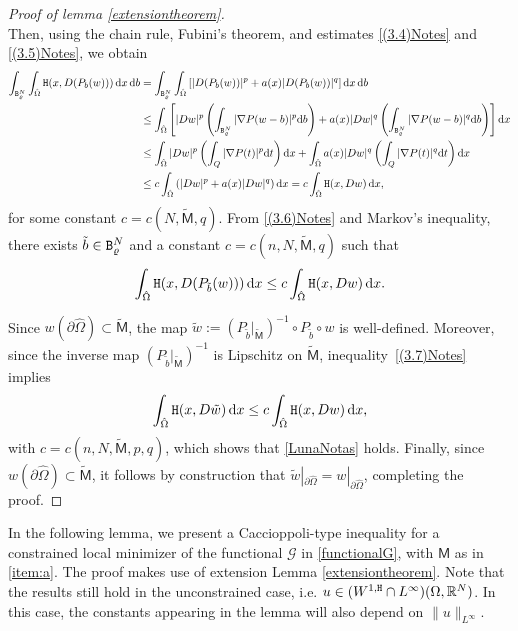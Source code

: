 \documentclass[a4paper]{amsart}
\theoremstyle{plain}  %
\numberwithin{equation}{section}
\newcommand{\R}{\mathbb{R}}
\newcommand{\mm}{\mathsf{M}}
\newcommand{\rr}{\varrho}
\newcommand{\nr}[1]{\lVert #1 \rVert}
\newcommand{\tx}[1]{\textnormal{\texttt{#1}}}
\begin{document}
\begin{proof}[Proof of lemma \ref{extensiontheorem}]
\[\]
Then, using the chain rule, Fubini’s theorem, and estimates \eqref{(3.4)Notes} and \eqref{(3.5)Notes}, we obtain
\begin{align}\label{(3.6)Notes}
\int_{\tx{B}_{\rr}^N} \int_{ \hat{\Omega}} \tx{H}(x, D(P_b(w)))\, \mathrm{d}x\, \mathrm{d}b 
&= \int_{\tx{B}_{\rr}^N} \int_{ \hat{\Omega}} \left[ |D(P_b(w))|^p + a(x)|D(P_b(w))|^q \right] \mathrm{d}x\, \mathrm{d}b \nonumber \\
&\leq \int_{ \hat{\Omega}} \left[ |Dw|^p \left( \int_{\tx{B}_\rr^N} |\nabla P(w - b)|^p \mathrm{d}b \right) + a(x) |Dw|^q \left( \int_{\tx{B}_\rr^N} |\nabla P(w - b)|^q \mathrm{d}b \right) \right] \mathrm{d}x \nonumber \\
&\leq \int_{ \hat{\Omega}} |Dw|^p \left( \int_Q |\nabla P(t)|^p \mathrm{d}t \right) \mathrm{d}x 
+ \int_{ \hat{\Omega}} a(x)|Dw|^q \left( \int_Q |\nabla P(t)|^q \mathrm{d}t \right) \mathrm{d}x \nonumber \\
&\leq c \int_{ \hat{\Omega}} \left( |Dw|^p + a(x) |Dw|^q \right) \mathrm{d}x 
= c \int_{ \hat{\Omega}} \tx{H}(x, Dw)\, \mathrm{d}x,
\end{align}
for some constant \( c = c(N, \tilde{\mm}, q) \). From \eqref{(3.6)Notes} and Markov’s inequality, there exists \( \tilde{b} \in \tx{B}_\rr^N \) and a constant \( c = c(n,N, \tilde{\mm}, q) \) such that
\begin{align}\label{(3.7)Notes}
\int_{ \hat{\Omega}} \tx{H}(x, D(P_{\tilde{b}}(w)))\, \mathrm{d}x 
\leq c \int_{ \hat{\Omega}} \tx{H}(x, Dw)\, \mathrm{d}x.
\end{align}

\noindent Since \( w(\partial  \hat{\Omega}) \subset \tilde{\mm} \), the map \( \tilde{w} := (P_{\tilde{b}}|_{\tilde{\mm}})^{-1}\circ P_{\tilde{b}} \circ w \) is well-defined. Moreover, since the inverse map \( (P_{\tilde{b}}|_{\tilde{\mm}})^{-1} \) is Lipschitz on \( \tilde{\mm} \), inequality~\eqref{(3.7)Notes} implies
\[
\int_{ \hat{\Omega}} \tx{H}(x, D\tilde{w})\, \mathrm{d}x \leq c \int_{ \hat{\Omega}} \tx{H}(x, Dw)\, \mathrm{d}x,
\]
with \( c = c(n,N, \tilde{\mm}, p, q) \), which shows that \eqref{LunaNotas} holds.  Finally, since \( w(\partial  \hat{\Omega}) \subset \tilde{\mm} \), it follows by construction that \( \tilde{w}|_{\partial  \hat{\Omega}} = w|_{\partial  \hat{\Omega}} \), completing the proof.

\end{proof}
\noindent
In the following lemma, we present a Caccioppoli-type inequality for a constrained local minimizer of the functional $\mathcal{G}$ in \eqref{functionalG}, with $\mm$ as in \ref{item:a}. The proof makes use of extension Lemma \ref{extensiontheorem}. Note that the results  still hold in the unconstrained case, i.e. $u \in (W^{1,\tx{H}}\cap L^{\infty}) (\Omega, \R^N)$. In this case, the constants appearing in the lemma will also depend on $\nr{u}_{L^{\infty}}$.
\end{document}
